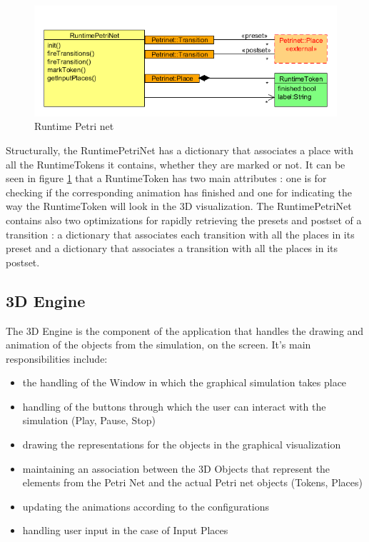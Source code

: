 \begin{figure}[ht]
   \begin{center}
       \includegraphics[scale=0.50]{image/runtime_petrinet.png}
       \caption{Runtime Petri net}
       \label{fig:petrinet_references}
       \end{center}
   \end{figure}

Structurally, the RuntimePetriNet has a dictionary that associates a place with
all the RuntimeTokens it contains, whether they are marked or not. It can be
seen in figure \ref{fig:petrinet_references} that a RuntimeToken has two main attributes : one is for
checking if the corresponding animation has finished and one for indicating the
way the RuntimeToken will look in the 3D visualization. The RuntimePetriNet
contains also two optimizations for rapidly retrieving the presets and postset
of a transition : a dictionary that associates each transition with all the
places in its preset and a dictionary that associates a transition with all the
places in its postset.

\subsection{3D Engine}

The 3D Engine is the component of the application that handles the drawing and animation of the
objects from the simulation, on the screen. It's main responsibilities include:

\begin{itemize} 
  \item the handling of the Window in which the graphical simulation takes place
  \item handling of the buttons through which the user can interact with the simulation (Play,
  Pause, Stop)
  \item drawing the representations for the objects in the graphical visualization
  \item maintaining an association between the 3D Objects that represent the elements from the Petri
  Net and the actual Petri net objects (Tokens, Places)
  \item updating the animations according to the configurations
  \item handling user input in the case of Input Places
\end{itemize}

